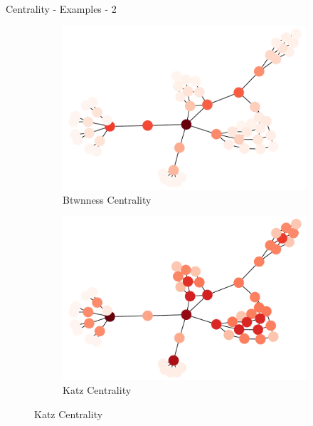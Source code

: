 \documentclass[a4paper,11pt]{book}
\begin{document}
\begin{textbox}{Centrality - Examples - 2}


\begin{figure}[H]

\begin{subfigure}{.5\textwidth}
\includegraphics[width=\textwidth]{pics/examplebetweenness.pdf}
    \caption{Btwnness Centrality}
\end{subfigure}
\begin{subfigure}{.5\textwidth}
\includegraphics[width=\textwidth]{pics/exampleKatz.pdf}
    \caption{Katz Centrality}
\end{subfigure}


\end{figure}
\end{textbox}
\end{document}
